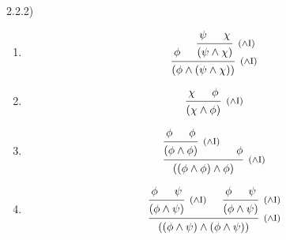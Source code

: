 \documentclass{article}
\theoremstyle{definition}
\newcommand{\ci}{\footnotesize ($\wedge$I)}
\begin{document}
2.2.2)
\begin{enumerate}
  \item 
  \[
    \begin{prooftree}
      \hypo{\phi}
      \hypo{\psi}
      \hypo{\chi}
      \infer2[\ci]{(\psi\land\chi)}
      \infer2[\ci]{(\phi \land (\psi\land\chi))}
    \end{prooftree}
  \]
  \item 
  \[
    \begin{prooftree}
      \hypo{\chi}
      \hypo{\phi}
      \infer2[\ci]{(\chi\land\phi)}
    \end{prooftree}
  \]

  \item 
  \[
    \begin{prooftree}
      \hypo{\phi}
      \hypo{\phi}
      \infer2[\ci]{(\phi\land\phi)}
      \hypo{\phi}
      \infer2[\ci]{((\phi\land\phi)\land \phi)}
    \end{prooftree}
  \]
  \item 
  \[
    \begin{prooftree}
      \hypo{\phi}
      \hypo{\psi}
      \infer2[\ci]{(\phi\land\psi)}
      \hypo{\phi}
      \hypo{\psi}
      \infer2[\ci]{(\phi\land\psi)}
      \infer2[\ci]{((\phi\land\psi)\land(\phi\land\psi))}
    \end{prooftree}
  \]

\end{enumerate}
\end{document}
